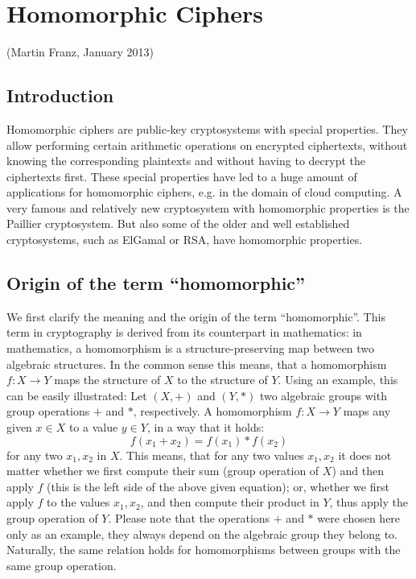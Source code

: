 
\newpage
\hypertarget{homciph}{}
\chapter{Homomorphic Ciphers}
\label{Chapter_HomomorphicCiphers}
(Martin Franz, January 2013)

\section{Introduction}

Homomorphic ciphers are public-key cryptosystems with special properties. They allow performing certain arithmetic operations on encrypted ciphertexts, without knowing the corresponding plaintexts and without having to decrypt the ciphertexts first. These special properties have led to a huge amount of applications for homomorphic ciphers, e.g. in the domain of cloud computing. A very famous and relatively new cryptosystem with homomorphic properties is the Paillier cryptosystem. But also some of the older and well established cryptosystems, such as ElGamal or RSA, have homomorphic properties.


\section{Origin of the term ``homomorphic''}

We first clarify the meaning and the origin of the term ``homomorphic''. This term in cryptography is derived from its counterpart in mathematics: in mathematics, a homomorphism is a structure-preserving map between two algebraic structures. In the common sense this means, that a homomorphism $f: X \to Y$ maps the structure of $X$ to the structure of $Y$. Using an example, this can be easily illustrated: Let $(X,+)$ and $(Y,*)$ two algebraic groups with group operations $+$ and $*$, respectively. A homomorphism $f: X \to Y$ maps any given $x \in X$ to a value $y \in Y$, in a way that it holds:
%
$$f(x_1 + x_2) = f(x_1) * f(x_2)$$
%
for any two $x_1, x_2$ in $X$. This means, that for any two values $x_1, x_2$ it does not matter whether we first compute their sum (group operation of $X$) and then apply $f$ (this is the left side of the above given equation); or, whether we first apply $f$ to the values $x_1, x_2$, and then compute their product in $Y$, thus apply the group operation of $Y$. Please note that the operations $+$ and $*$ were chosen here only as an example, they always depend on the algebraic group they belong to. Naturally, the same relation holds for homomorphisms between groups with the same group operation.

